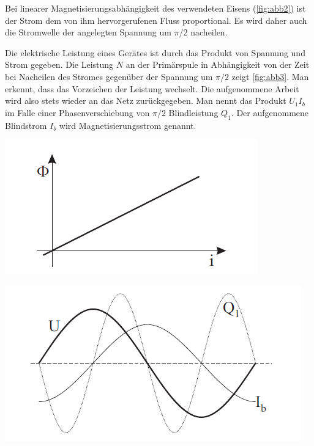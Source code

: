 \documentclass[11pt,ngerman]{scrartcl}
\begin{document}
Bei linearer Magnetisierungsabhängigkeit des verwendeten Eisens (\autoref{fig:abb2}) ist der Strom dem
von ihm hervorgerufenen Fluss proportional. Es wird daher auch die Stromwelle der angelegten
Spannung um $\pi / 2$ nacheilen.

Die elektrische Leistung eines Gerätes ist durch das Produkt von Spannung und Strom gegeben.
Die Leistung $N$ an der Primärspule in Abhängigkeit von der Zeit bei Nacheilen des Stromes
gegenüber der Spannung um $\pi / 2$ zeigt \autoref{fig:abb3}. Man erkennt, dass das Vorzeichen der Leistung
wechselt. Die aufgenommene Arbeit wird also stets wieder an das Netz zurückgegeben. Man
nennt das Produkt $U_1 I_b$ im Falle einer Phasenverschiebung von $\pi / 2$ Blindleistung $Q_1$. Der aufgenommene
Blindstrom $I_b$ wird Magnetisierungsstrom genannt.

\begin{minipage}{\textwidth}
	\begin{minipage}[t]{0.5\textwidth}
		\centering
		\includegraphics[width=\textwidth]{abb2}
		\label{fig:abb2}
	\end{minipage}
	\vspace{2mm}
	\begin{minipage}[t]{0.50\textwidth}
		\centering
		\includegraphics[width=\textwidth]{abb3}
		\label{fig:abb3}
	\end{minipage}
	\vspace{1em}
\end{minipage}
\end{document}
